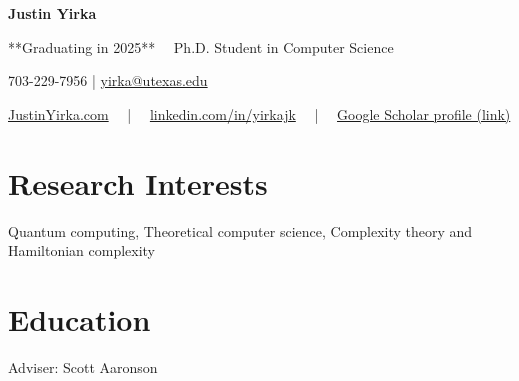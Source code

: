 \documentclass[11pt,letterpaper,serif]{moderncv}
\begin{document}
\pagestyle{normal}


\thispagestyle{firstpage}

\begin{center}
	{\LARGE\textbf{Justin Yirka}}

	**Graduating in 2025**~~ Ph.D. Student in Computer Science

	\vspace{0.5\baselineskip}

	703-229-7956 | 	\href{mailto:yirka@utexas.edu}{yirka@utexas.edu}

	\href{www.justinyirka.com}{JustinYirka.com}
	~~|~~
	\href{https://www.linkedin.com/in/yirkajk/}{linkedin.com/in/yirkajk}
	~~|~~
	\href{https://scholar.google.com/citations?user=UxIpR_UAAAAJ}{Google Scholar profile (link)}
\end{center}


\setlength{\parskip}{0em}

\section{Research Interests}
Quantum computing, Theoretical computer science, Complexity theory and Hamiltonian complexity


\section{Education}
{
	\normalsize
	\begin{adjustwidth}{.25in}{}
		Adviser: Scott Aaronson
	\end{adjustwidth}
}
{%
}
{}
\vspace{\parsep}
\end{document}
